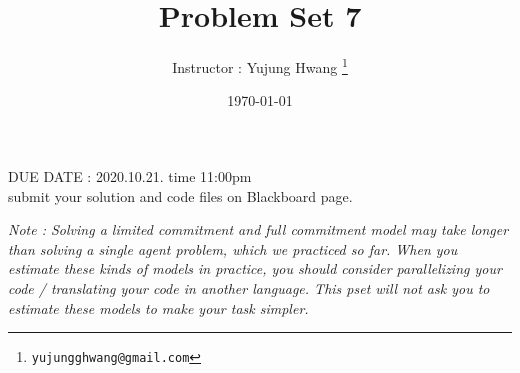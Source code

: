 \documentclass[paper=a4, fontsize=13pt]{extarticle} %
\numberwithin{equation}{section} %
\numberwithin{figure}{section} %
\numberwithin{table}{section} %
\begin{document}
\title{	
\normalfont \normalsize 
\huge Problem Set 7
}
\author{
Instructor : Yujung Hwang \thanks{\texttt{yujungghwang@gmail.com}}} %
\date{\today} %
\maketitle %

\upshape \mdseries 
\begin{center}
DUE DATE : 2020.10.21. time 11:00pm \\
submit your solution and code files on Blackboard page.
\end{center}

\textit{Note :  Solving a limited commitment and full commitment model may take longer than solving a single agent problem, which we practiced so far. When you estimate these kinds of models in practice, you should consider parallelizing your code / translating your code in another language. This pset will not ask you to estimate these models to make your task simpler.} \\
\end{document}

